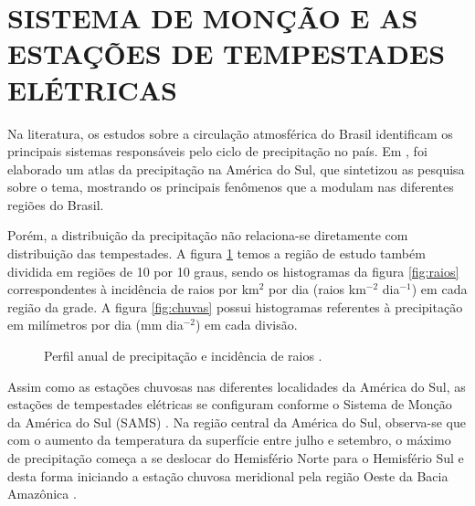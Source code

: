 \section{SISTEMA DE MONÇÃO E AS ESTAÇÕES DE TEMPESTADES ELÉTRICAS}

Na literatura, os estudos sobre a circulação atmosférica do Brasil identificam os principais sistemas responsáveis pelo ciclo de precipitação no país. Em , foi elaborado um atlas da precipitação na América do Sul, que sintetizou as pesquisa sobre o tema, mostrando os principais fenômenos que a modulam nas diferentes regiões do Brasil.

Porém, a distribuição da precipitação não relaciona-se diretamente com distribuição das tempestades. A figura \ref{fig:pl} temos a região de estudo também dividida em regiões de 10 por 10 graus, sendo os histogramas da figura \ref{fig:raios} correspondentes à incidência de raios por km$^{2}$ por dia (raios km$^{-2}$ dia$^{-1}$) em cada região da grade. A figura \ref{fig:chuvas} possui histogramas referentes à precipitação em milímetros por dia (mm dia$^{-2}$) em cada divisão. %


\begin{figure}[h!]
   \centering
   \caption{Perfil anual de precipitação e incidência de raios \cite{cmorales}.}
   \label{fig:pl}
\end{figure}



Assim como as estações chuvosas nas diferentes localidades da América do Sul, as estações de tempestades elétricas se configuram conforme o Sistema de Monção da América do Sul (SAMS) . Na região central da América do Sul, observa-se que com o aumento da temperatura da superfície entre julho e setembro, o máximo de precipitação começa a se deslocar do Hemisfério Norte para o Hemisfério Sul e desta forma iniciando a estação chuvosa meridional pela região Oeste da Bacia Amazônica \cite{Zhou1998,grimm2003nino,reboita2010regimes,Marengo2012, bombardi2008variabilidade}.

